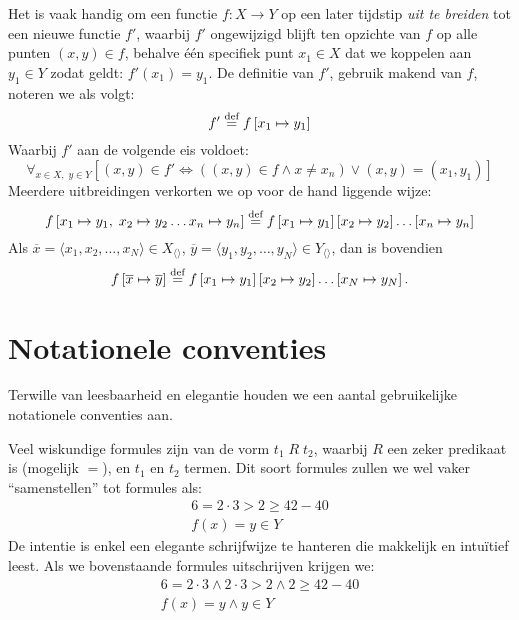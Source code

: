Het is vaak handig om een functie $f : X \to Y$ op een later tijdstip \emph{uit te breiden} tot een nieuwe functie $f'$, waarbij $f'$ ongewijzigd blijft ten opzichte van $f$ op alle punten $(x, y) \in f$, behalve één specifiek punt $x_1 \in X$ dat we koppelen aan $y_1 \in Y$ zodat geldt: $f'(x_1) = y_1$. De definitie van $f'$, gebruik makend van $f$, noteren we als volgt:
%
\begin{equation*}
  f' \DEF f \left[ x_1 \mapsto y_1 \right]
\end{equation*}
%
Waarbij $f'$ aan de volgende eis voldoet:
%
\begin{equation*}
  \forall_{x \in X,\; y \in Y} \left[ (x, y) \in f' \Leftrightarrow \left( (x, y) \in f \land x \neq x_n \right) \lor (x, y) = (x_1, y_1) \right]
\end{equation*}
%
Meerdere uitbreidingen verkorten we op voor de hand liggende wijze:
%
\begin{equation*}
  f \left[ x_1 \mapsto y_1,\; x_2 \mapsto y_2 \dots x_n \mapsto y_n \right]
  \DEF
  f \left[ x_1 \mapsto y_1 \right]
    \left[ x_2 \mapsto y_2 \right]\dots
    \left[ x_n \mapsto y_n \right]
\end{equation*}
%
Als $\overline{x} = \langle x_1, x_2, \dots, x_N\rangle \in X_{\langle\rangle}$, $\overline{y} = \langle y_1, y_2, \dots, y_N\rangle \in Y_{\langle\rangle}$, dan is bovendien
%
\begin{equation*}
  f \left[ \overline{x} \mapsto \overline{y} \right] \DEF
  f \left[ x_1 \mapsto y_1 \right]
    \left[ x_2 \mapsto y_2 \right]\dots
    \left[ x_N \mapsto y_N \right].
\end{equation*}

\section{Notationele conventies}
\label{sec:conventies}

Terwille van leesbaarheid en elegantie houden we een aantal gebruikelijke notationele conventies aan.

Veel wiskundige formules zijn van de vorm $t_1\; R\; t_2$, waarbij $R$ een zeker predikaat is (mogelijk $=$), en $t_1$ en $t_2$ termen. Dit soort formules zullen we wel vaker “samenstellen” tot formules als:
\begin{gather*}
  6 = 2 \cdot 3 > 2 \ge 42 - 40 \\
  f(x) = y \in Y
\end{gather*}
De intentie is enkel een elegante schrijfwijze te hanteren die makkelijk en intuïtief leest.
Als we bovenstaande formules uitschrijven krijgen we:
\begin{gather*}
  6 = 2 \cdot 3 \land 2 \cdot 3 > 2 \land 2 \ge 42 - 40 \\
  f(x) = y \land y \in Y
\end{gather*}

